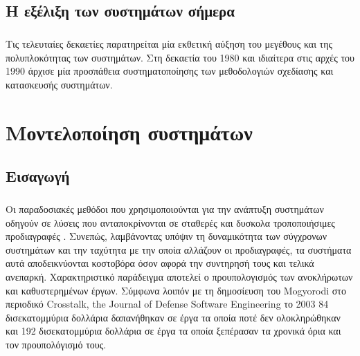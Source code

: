 \documentclass[a4paper,12pt,twoside]{report}
\begin{document}
		\section{Η εξέλιξη των συστημάτων σήμερα}
			\paragraph{} {Τις τελευταίες δεκαετίες παρατηρείται μία εκθετική αύξηση του μεγέθους και της πολυπλοκότητας των συστημάτων.  Στη δεκαετία του 1980 και ιδιαίτερα στις αρχές του 1990 άρχισε μία προσπάθεια συστηματοποίησης των μεθοδολογιών σχεδίασης και κατασκευσής συστημάτων. \cite{FoundationalConceptsMDSD}
			}
							
	\chapter{Μοντελοποίηση συστημάτων}
		\label{κεφ.:Μοντελοποίηση συστημάτων}

		\section{Εισαγωγή}
			\paragraph{} {Οι παραδοσιακές μεθόδοι που χρησιμοποιούνται για την ανάπτυξη συστημάτων οδηγούν σε λύσεις που ανταποκρίνονται σε σταθερές και δυσκολα τροποποιήσιμες προδιαγραφές . Συνεπώς, λαμβάνοντας υπόψιν τη δυναμικότητα των σύγχρονων συστημάτων και την ταχύτητα με την οποία αλλάζουν οι προδιαγραφές, τα συστήματα αυτά αποδεικνύονται κοστοβόρα όσον αφορά την συντηρησή τους και τελικά ανεπαρκή. Χαρακτηριστικό παράδειγμα αποτελεί ο προυπολογισμός των ανοκλήρωτων και καθυστερημένων έργων. Σύμφωνα λοιπόν με τη δημοσίευση του Mogyorodi στο περιοδικό Crosstalk, the Journal of Defense Software Engineering το 2003 \cite{JournalDefenseMogyorodi} 84 δισεκατομμύρια δολλάρια δαπανήθηκαν σε έργα τα οποία ποτέ δεν ολοκληρώθηκαν και 192 δισεκατομμύρια δολλάρια σε έργα τα οποία ξεπέρασαν τα χρονικά όρια και τον προυπολόγισμό τους.
			}
\end{document}
